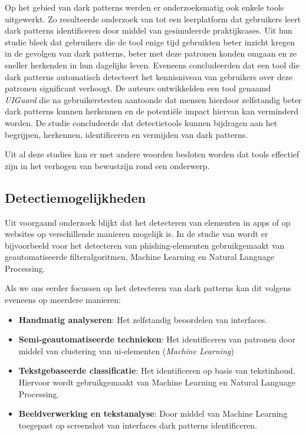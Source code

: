 \vspace{1em}

Op het gebied van dark patterns werden er onderzoeksmatig ook enkele tools uitgewerkt. Zo resulteerde onderzoek van \textcite{Ye2025} tot een leerplatform dat gebruikers leert dark patterns identificeren door middel van gesimuleerde praktijkcases. Uit hun studie bleek dat gebruikers die de tool enige tijd gebruikten beter inzicht kregen in de gevolgen van dark patterns, beter met deze patronen konden omgaan en ze sneller herkenden in hun dagelijks leven. Eveneens \textcite{Chen2024a} concludeerden dat een tool die dark patterns automatisch detecteert het kennisniveau van gebruikers over deze patronen significant verhoogt. De auteurs ontwikkelden een tool genaamd \textit{UIGuard} die na gebruikerstesten aantoonde dat mensen hierdoor zelfstandig beter dark patterns kunnen herkennen en de potentiële impact hiervan kan verminderd worden. De studie concludeerde dat detectietools kunnen bijdragen aan het begrijpen, herkennen, identificeren en vermijden van dark patterns.

\vspace{1em}

Uit al deze studies kan er met andere woorden besloten worden dat tools effectief zijn in het verhogen van bewustzijn rond een onderwerp.

\vspace{1em}

\subsection{Detectiemogelijkheden}
\label{subsec:detectie-mogelijkheden}

\vspace{1em}

Uit voorgaand onderzoek blijkt dat het detecteren van elementen in apps of op websites op verschillende manieren mogelijk is. In de studie van \textcite{Baltuttis2024} wordt er bijvoorbeeld voor het detecteren van phishing-elementen gebruikgemaakt van geautomatiseerde filteralgoritmen, Machine Learning en Natural Language Processing. 

\vspace{1em}

Als we ons eerder focussen op het detecteren van dark patterns kan dit volgens \textcite{Nie2024} eveneens op meerdere manieren:

\begin{itemize}
    \item \textbf{Handmatig analyseren}: Het zelfstandig beoordelen van interfaces.
    \item \textbf{Semi-geautomatiseerde technieken}: Het identificeren van patronen door middel van clustering van \acrshort{ui}-elementen (\textit{Machine Learning})
    \item \textbf{Tekstgebaseerde classificatie}: Het identificeren op basis van tekstinhoud. Hiervoor wordt gebruikgemaakt van Machine Learning en Natural Language Processing.
    \item \textbf{Beeldverwerking en tekstanalyse}: Door middel van Machine Learning toegepast op screenshot van interfaces dark patterns identificeren.
\end{itemize}

